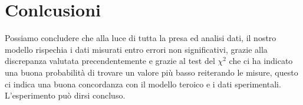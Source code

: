 \documentclass[a4paper,10pt]{article}
\begin{document}
\section{Conlcusioni}
Possiamo concludere che alla luce di tutta la presa ed analisi dati, il nostro modello rispechia i dati misurati entro errori non significativi, grazie alla discrepanza valutata precendentemente e 
grazie al test del $\chi^2$ che ci ha indicato una buona probabilità di trovare un valore più basso reiterando le misure, questo ci indica una buona concordanza con il modello teroico e i dati sperimentali.
L'esperimento può dirsi concluso.
\end{document}
